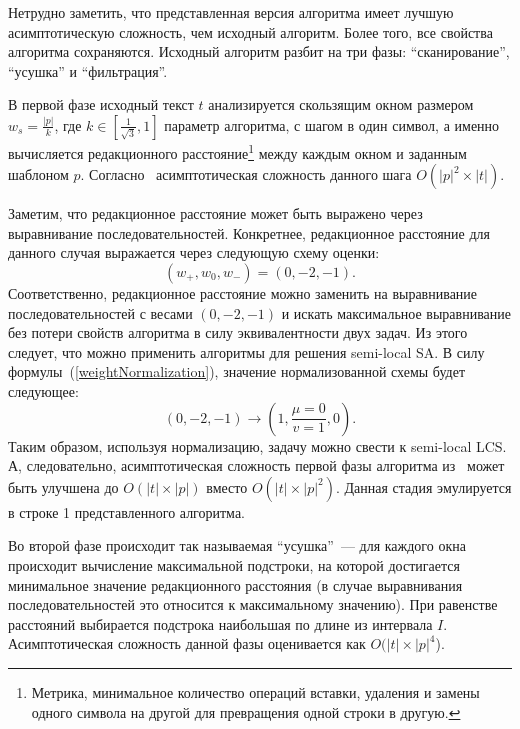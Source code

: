 Нетрудно заметить, что представленная версия алгоритма имеет лучшую асимптотическую сложность, чем исходный алгоритм.
Более того, все свойства алгоритма сохраняются.
Исходный алгоритм разбит на три фазы: ``сканирование'', ``усушка'' и ``фильтрация''.

В первой фазе исходный текст $t$ анализируется скользящим окном размером $w_{s} = \frac{|p|}{k}$, где $k \in [\frac{1}{\sqrt{3}},1]$ параметр алгоритма, с шагом в один символ, а именно вычисляется редакционного расстояние\footnote{Метрика, минимальное количество операций вставки, удаления и замены одного символа на другой для превращения одной строки в другую.} между каждым окном и заданным шаблоном $p$.
Согласно~\cite{luciv2019interactive} асимптотическая сложность данного шага $O(|p|^2 \times |t|)$.

Заметим, что редакционное расстояние может быть выражено через выравнивание последовательностей.
Конкретнее, редакционное расстояние для данного случая выражается через следующую схему оценки:
\begin{equation}\label{weightAppr}
    (w_{+},w_{0},w_{-}) = (0,-2,-1).
\end{equation}
Соответственно, редакционное расстояние можно заменить на выравнивание последовательностей с весами $(0,-2,-1)$ и искать максимальное выравнивание без потери свойств алгоритма в силу эквивалентности двух задач.
Из этого следует, что можно применить алгоритмы для решения semi-local SA.
В силу формулы~(\ref{weightNormalization}), значение нормализованной схемы будет следующее:
\begin{equation}
    (0, -2, -1) \rightarrow (1,\frac{\mu=0}{v=1}, 0).
\end{equation}
Таким образом, используя нормализацию, задачу можно свести к semi-local LCS.
А, следовательно, асимптотическая сложность первой фазы алгоритма из~\cite{luciv2019interactive} может быть улучшена до $O(|t| \times |p|)$ вместо $O(|t| \times |p|^2)$.
Данная стадия эмулируется в строке 1 представленного алгоритма.

Во второй фазе происходит так называемая ``усушка''~--- для каждого окна происходит вычисление максимальной подстроки, на которой достигается минимальное значение редакционного расстояния (в случае выравнивания последовательностей это относится к максимальному значению).
При равенстве расстояний выбирается подстрока наибольшая по длине из интервала $I$.
Асимптотическая сложность данной фазы оценивается как $O(|t| \times |p|^4$).

